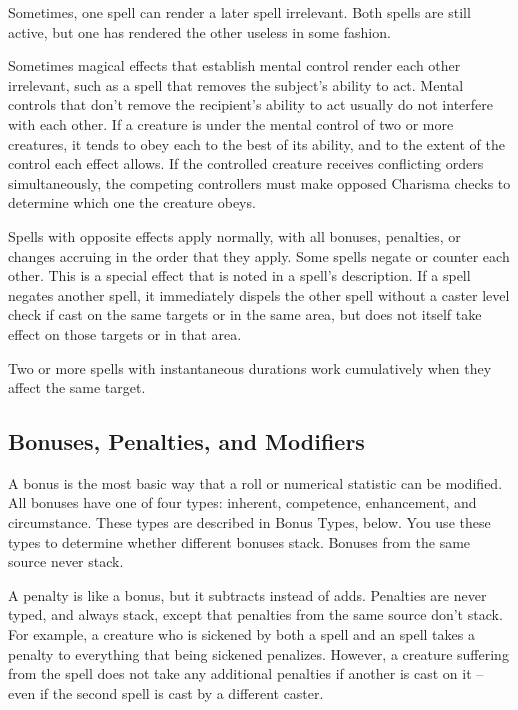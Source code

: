  Sometimes, one spell can render a later spell irrelevant. Both spells are still active, but one has rendered the other useless in some fashion.

 Sometimes magical effects that establish mental control render each other irrelevant, such as a spell that removes the subject's ability to act. Mental controls that don't remove the recipient's ability to act usually do not interfere with each other. If a creature is under the mental control of two or more creatures, it tends to obey each to the best of its ability, and to the extent of the control each effect allows. If the controlled creature receives conflicting orders simultaneously, the competing controllers must make opposed Charisma checks to determine which one the creature obeys.

 Spells with opposite effects apply normally, with all bonuses, penalties, or changes accruing in the order that they apply. Some spells negate or counter each other. This is a special effect that is noted in a spell's description. If a spell negates another spell, it immediately dispels the other spell without a caster level check if cast on the same targets or in the same area, but does not itself take effect on those targets or in that area.

 Two or more spells with instantaneous durations work cumulatively when they affect the same target.

\subsection{Bonuses, Penalties, and Modifiers}
A bonus is the most basic way that a roll or numerical statistic can be modified. All bonuses have one of four types: inherent, competence, enhancement, and circumstance. These types are described in Bonus Types, below. You use these types to determine whether different bonuses stack. Bonuses from the same source never stack.

A penalty is like a bonus, but it subtracts instead of adds. Penalties are never typed, and always stack, except that penalties from the same source don't stack. For example, a creature who is sickened by both a  spell and an  spell takes a  penalty to everything that being sickened penalizes. However, a creature suffering from the  spell does not take any additional penalties if another  is cast on it -- even if the second spell is cast by a different caster.

